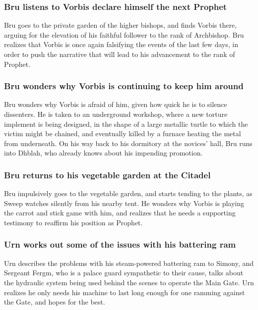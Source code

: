 \subsubsection{\Gls{Bru} listens to \Gls{Vorbis} declare himself the next Prophet}
\Gls{Bru} goes to the private garden of the higher bishops, and finds \Gls{Vorbis} there, arguing
for the elevation of his faithful follower to the rank of Archbishop. \Gls{Bru} realizes that
\Gls{Vorbis} is once again falsifying the events of the last few days, in order to push the
narrative that will lead to his advancement to the rank of Prophet.

\subsubsection{\Gls{Bru} wonders why \Gls{Vorbis} is continuing to keep him around}
\Gls{Bru} wonders why \Gls{Vorbis} is afraid of him, given how quick he is to silence dissenters.
He is taken to an underground workshop, where a new torture implement is being designed, in the
shape of a large metallic turtle to which the victim might be chained, and eventually killed by
a furnace heating the metal from underneath. On his way back to his dormitory at the novices' hall,
\Gls{Bru} runs into \Gls{Dhblah}, who already knows about his impending promotion.

\subsubsection{\Gls{Bru} returns to his vegetable garden at the Citadel}
\Gls{Bru} impulsively goes to the vegetable garden, and starts tending to the plants, as \Gls{Sweep}
watches silently from his nearby tent. He wonders why \Gls{Vorbis} is playing the carrot and stick
game with him, and realizes that he needs a supporting testimony to reaffirm his position as
Prophet.

\subsubsection{\Gls{Urn} works out some of the issues with his battering ram}
\Gls{Urn} describes the problems with his steam-powered battering ram to \Gls{Simony}, and
Sergeant \Gls{Fergm}, who is a palace guard sympathetic to their cause, talks about the hydraulic
system being used behind the scenes to operate the Main Gate. \Gls{Urn} realizes he only needs his
machine to last long enough for one ramming against the Gate, and hopes for the best.

